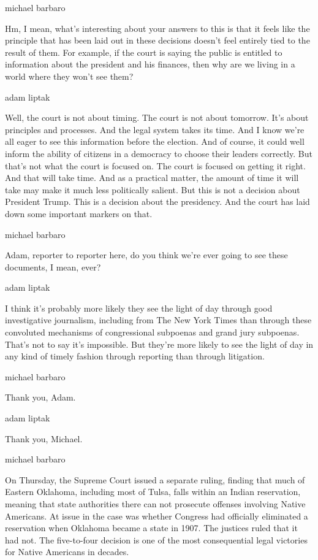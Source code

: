 michael barbaro

Hm, I mean, what's interesting about your answers to this is that it
feels like the principle that has been laid out in these decisions
doesn't feel entirely tied to the result of them. For example, if the
court is saying the public is entitled to information about the
president and his finances, then why are we living in a world where they
won't see them?

adam liptak

Well, the court is not about timing. The court is not about tomorrow.
It's about principles and processes. And the legal system takes its
time. And I know we're all eager to see this information before the
election. And of course, it could well inform the ability of citizens in
a democracy to choose their leaders correctly. But that's not what the
court is focused on. The court is focused on getting it right. And that
will take time. And as a practical matter, the amount of time it will
take may make it much less politically salient. But this is not a
decision about President Trump. This is a decision about the presidency.
And the court has laid down some important markers on that.

michael barbaro

Adam, reporter to reporter here, do you think we're ever going to see
these documents, I mean, ever?

adam liptak

I think it's probably more likely they see the light of day through good
investigative journalism, including from The New York Times than through
these convoluted mechanisms of congressional subpoenas and grand jury
subpoenas. That's not to say it's impossible. But they're more likely to
see the light of day in any kind of timely fashion through reporting
than through litigation.

michael barbaro

Thank you, Adam.

adam liptak

Thank you, Michael.

michael barbaro

On Thursday, the Supreme Court issued a separate ruling, finding that
much of Eastern Oklahoma, including most of Tulsa, falls within an
Indian reservation, meaning that state authorities there can not
prosecute offenses involving Native Americans. At issue in the case was
whether Congress had officially eliminated a reservation when Oklahoma
became a state in 1907. The justices ruled that it had not. The
five-to-four decision is one of the most consequential legal victories
for Native Americans in decades.


